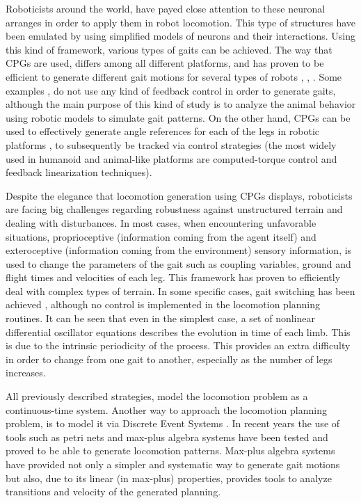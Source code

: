 \documentclass[../main.tex]{subfiles}
\begin{document}
	Roboticists around the world, have payed close attention to these neuronal arranges in order to apply them in robot locomotion. This type of structures have been emulated by using simplified models of neurons and their interactions. Using this kind of framework, various types of gaits can be achieved. The way that CPGs are used, differs among all different platforms, and has proven to be efficient to generate different gait motions for several types of robots \cite{Crespi1985}, \cite{Ijspeert2008}, \cite{Barasuola}. Some examples \cite{Ijspeert}, do not use any kind of feedback control in order to generate gaits, although the main purpose of this kind of study is to analyze the animal behavior using robotic models to simulate gait patterns. On the other hand, CPGs can be used to effectively generate angle references for each of the legs in robotic platforms \cite{Barasuol}, to subsequently be tracked via control strategies (the most widely used in humanoid and animal-like platforms are computed-torque control and feedback linearization techniques). 
	
	Despite the elegance that locomotion generation using CPGs displays, roboticists are facing big challenges regarding robustness against unstructured terrain and dealing with disturbances. In most cases, when encountering unfavorable situations, proprioceptive (information coming from the agent itself) and exteroceptive (information coming from the environment) sensory information, is used to change the parameters of the gait such as coupling variables, ground and flight times and velocities of each leg. This framework has proven to efficiently deal with complex types of terrain. In some specific cases, gait switching has been achieved \cite{Ijspeert}, although no control is implemented in the locomotion planning routines. It can be seen that even in the simplest case, a set of nonlinear differential oscillator equations describes the evolution in time of each limb. This is due to the intrinsic periodicity of the process. This provides an extra difficulty in order to change from one gait to another, especially as the number of legs increases. 
	
	All previously described strategies, model the locomotion problem as a continuous-time system. Another way to approach the locomotion planning problem, is to model it via Discrete Event Systems \cite{Schutter2009}. In recent years the use of tools such as petri nets and max-plus algebra systems have been tested and proved to be able to generate locomotion patterns. Max-plus algebra systems have provided not only a simpler and systematic way to generate gait motions but also, due to its linear (in max-plus) properties, provides tools to analyze transitions and velocity of the generated planning.
	
\end{document}
